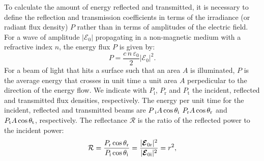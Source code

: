 \indent To calculate the amount of energy reflected and transmitted, it is necessary to define the reflection and transmission coefficients in terms of the irradiance (or radiant flux density) $P$ rather than in terms of amplitudes of the electric field. For a wave of amplitude $|\boldsymbol{\mathcal{E}}_0|$ propagating in a non-magnetic medium with a refractive index $n$, the energy flux $P$ is given by:
\begin{equation}
P = \frac{c\, n \, \varepsilon_0}{2}|\boldsymbol{\mathcal{E}}_0|^2.
\end{equation}
For a beam of light that hits a surface such that an area $A$ is illuminated,
$P$ is the average energy that crosses in unit time a unit area $A$ perpedicular to the direction of the energy flow.
We indicate with $P_{\textrm{i}}$, $P_{\textrm{r}}$ and $P_{\textrm{t}}$ the incident, reflected and transmitted flux densities, respectively.
The energy per unit time for the incident, reflected and transmitted beams are 
$P_\textrm{
i} A\cos\theta_\textrm{i}$ $P_\textrm{r} A\cos\theta_\textrm{r}$ and 
$P_\textrm{t} A\cos\theta_\textrm{t}$, respectively. %
The reflectance $\mathcal{R}$ is the ratio of the reflected power to the incident power:
\begin{equation}\label{reflectance}
\mathcal{R} = \frac{P_\textrm{r}\cos\theta_\textrm{r}}{P_\textrm{i}\cos\theta_\textrm{i}} = \frac{|\boldsymbol{\mathcal{E}}_{0 \textrm{r}}|^2}{|\boldsymbol{\mathcal{E}}_{0 \textrm{i}}|^2} = r^2,
\end{equation}

